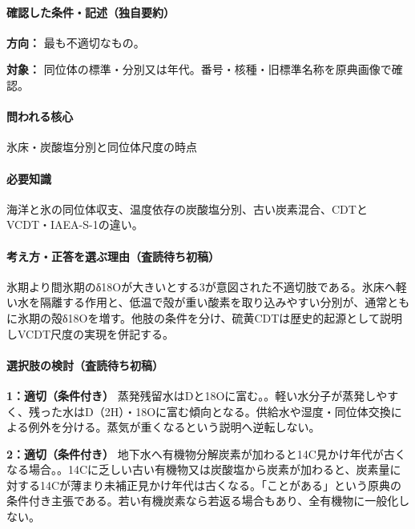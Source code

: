 \paragraph{確認した条件・記述（独自要約）}\mbox{}\par

\noindent\textbf{方向：} 最も不適切なもの。\par

\noindent\textbf{対象：} 同位体の標準・分別又は年代。番号・核種・旧標準名称を原典画像で確認。\par

\paragraph{問われる核心} 氷床・炭酸塩分別と同位体尺度の時点

\paragraph{必要知識} 海洋と氷の同位体収支、温度依存の炭酸塩分別、古い炭素混合、CDTとVCDT・IAEA-S-1の違い。

\paragraph{考え方・正答を選ぶ理由（査読待ち初稿）} 氷期より間氷期のδ18Oが大きいとする3が意図された不適切肢である。氷床へ軽い水を隔離する作用と、低温で殻が重い酸素を取り込みやすい分別が、通常ともに氷期の殻δ18Oを増す。他肢の条件を分け、硫黄CDTは歴史的起源として説明しVCDT尺度の実現を併記する。

\paragraph{選択肢の検討（査読待ち初稿）}\mbox{}\par

\noindent\textbf{1：適切（条件付き）} 蒸発残留水はDと18Oに富む。。軽い水分子が蒸発しやすく、残った水はD（2H）・18Oに富む傾向となる。供給水や湿度・同位体交換による例外を分ける。蒸気が重くなるという説明へ逆転しない。\par

\noindent\textbf{2：適切（条件付き）} 地下水へ有機物分解炭素が加わると14C見かけ年代が古くなる場合。。14Cに乏しい古い有機物又は炭酸塩から炭素が加わると、炭素量に対する14Cが薄まり未補正見かけ年代は古くなる。「ことがある」という原典の条件付き主張である。若い有機炭素なら若返る場合もあり、全有機物に一般化しない。\par

